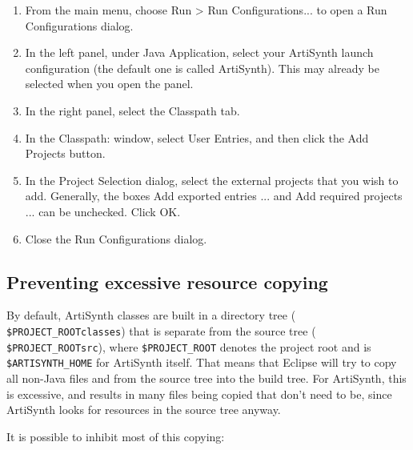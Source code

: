 \begin{enumerate}

\item From the main menu, choose {\sf Run > Run Configurations...}
to open a {\sf Run Configurations} dialog.

\item In the left panel, under {\sf Java Application}, select your
ArtiSynth launch configuration (the default one is called {\sf
ArtiSynth}). This may already be selected when you open the panel.

\item In the right panel, select the {\sf Classpath} tab.

\item In the {\sf Classpath:} window, select {\sf User Entries},
and then click the {\sf Add Projects} button.

\item In the {\sf Project Selection} dialog, select the external
projects that you wish to add. Generally, the boxes
{\sf Add exported entries ...} and {\sf Add required projects ...}
can be unchecked. Click {\sf OK}.

\item Close the {\sf Run Configurations} dialog.

\end{enumerate}

\subsection{Preventing excessive resource copying}

By default, ArtiSynth classes are built in a directory tree ({\tt
\$PROJECT\_ROOT\SEP classes}) that is separate from the source tree ({\tt
\$PROJECT\_ROOT\SEP src}), where {\tt \$PROJECT\_ROOT} denotes the project
root \directory and is {\tt \$ARTISYNTH\_HOME} for ArtiSynth itself.
That means that Eclipse will try to copy all non-Java files and
\directories from the source tree into the build tree. For ArtiSynth,
this is excessive, and results in many files being copied that don't
need to be, since ArtiSynth looks for resources in the source tree
anyway.

It is possible to inhibit most of this copying:

